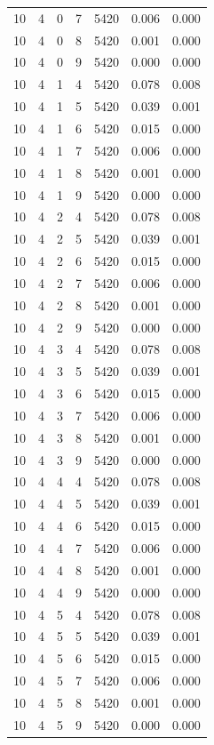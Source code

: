 \begin{table}
\begin{tabular}{rrrrrrr}
10 & 4 & 0 & 7 & 5420 & 0.006 & 0.000 \\
10 & 4 & 0 & 8 & 5420 & 0.001 & 0.000 \\
10 & 4 & 0 & 9 & 5420 & 0.000 & 0.000 \\
10 & 4 & 1 & 4 & 5420 & 0.078 & 0.008 \\
10 & 4 & 1 & 5 & 5420 & 0.039 & 0.001 \\
10 & 4 & 1 & 6 & 5420 & 0.015 & 0.000 \\
10 & 4 & 1 & 7 & 5420 & 0.006 & 0.000 \\
10 & 4 & 1 & 8 & 5420 & 0.001 & 0.000 \\
10 & 4 & 1 & 9 & 5420 & 0.000 & 0.000 \\
10 & 4 & 2 & 4 & 5420 & 0.078 & 0.008 \\
10 & 4 & 2 & 5 & 5420 & 0.039 & 0.001 \\
10 & 4 & 2 & 6 & 5420 & 0.015 & 0.000 \\
10 & 4 & 2 & 7 & 5420 & 0.006 & 0.000 \\
10 & 4 & 2 & 8 & 5420 & 0.001 & 0.000 \\
10 & 4 & 2 & 9 & 5420 & 0.000 & 0.000 \\
10 & 4 & 3 & 4 & 5420 & 0.078 & 0.008 \\
10 & 4 & 3 & 5 & 5420 & 0.039 & 0.001 \\
10 & 4 & 3 & 6 & 5420 & 0.015 & 0.000 \\
10 & 4 & 3 & 7 & 5420 & 0.006 & 0.000 \\
10 & 4 & 3 & 8 & 5420 & 0.001 & 0.000 \\
10 & 4 & 3 & 9 & 5420 & 0.000 & 0.000 \\
10 & 4 & 4 & 4 & 5420 & 0.078 & 0.008 \\
10 & 4 & 4 & 5 & 5420 & 0.039 & 0.001 \\
10 & 4 & 4 & 6 & 5420 & 0.015 & 0.000 \\
10 & 4 & 4 & 7 & 5420 & 0.006 & 0.000 \\
10 & 4 & 4 & 8 & 5420 & 0.001 & 0.000 \\
10 & 4 & 4 & 9 & 5420 & 0.000 & 0.000 \\
10 & 4 & 5 & 4 & 5420 & 0.078 & 0.008 \\
10 & 4 & 5 & 5 & 5420 & 0.039 & 0.001 \\
10 & 4 & 5 & 6 & 5420 & 0.015 & 0.000 \\
10 & 4 & 5 & 7 & 5420 & 0.006 & 0.000 \\
10 & 4 & 5 & 8 & 5420 & 0.001 & 0.000 \\
10 & 4 & 5 & 9 & 5420 & 0.000 & 0.000 \\

\end{tabular}
\end{table}
